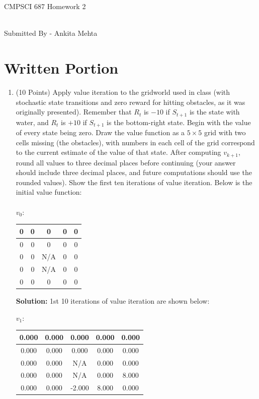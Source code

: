 \documentclass{article}
\begin{document}
\begin{center}
    \begin{Large}
    CMPSCI 687 Homework 2
    \end{Large}
    \\
    Submitted By - Ankita Mehta
\end{center}

\section*{Written Portion}
\begin{enumerate}
    \item (10 Points) Apply value iteration to the gridworld used in class (with stochastic state transitions and zero reward for hitting obstacles, as it was originally presented). Remember that $R_t$ is $-10$ if $S_{t+1}$ is the state with water, and $R_t$ is $+10$ if $S_{t+1}$ is the bottom-right state. Begin with the value of every state being zero. Draw the value function as a $5 \times 5$ grid with two cells missing (the obstacles), with numbers in each cell of the grid correspond to the current estimate of the value of that state. After computing $v_{k+1}$, round all values to three decimal places before continuing (your answer should include three decimal places, and future computations should use the rounded values). Show the first ten iterations of value iteration. Below is the initial value function:
    \\\\
    $v_0$:
    \begin{tabular}{|c|c|c|c|c|}
    \hline
        0 & 0 & 0 & 0 & 0\\
        \hline
        0 & 0 & 0 & 0 & 0\\
        \hline
        0 & 0 & N/A & 0 & 0\\
        \hline
        0 & 0 & N/A & 0 & 0\\
        \hline
        0 & 0 & 0 & 0 & 0\\
        \hline
    \end{tabular}
    
    \textbf{Solution:} 1st 10 iterations of value iteration are shown below:
    
    $v_1$:

 \begin{tabular}{|c|c|c|c|c|}

     \hline
      0.000 & 0.000 & 0.000 & 0.000 & 0.000  \\
    \hline
    0.000 & 0.000 & 0.000 & 0.000 & 0.000  \\
    \hline
     0.000 & 0.000 &  N/A & 0.000 & 0.000  \\
    \hline
     0.000 & 0.000 &  N/A & 0.000 & 8.000  \\
    \hline
    0.000 & 0.000 & -2.000 & 8.000 & 0.000  \\
    \hline


\end{tabular}
\end{enumerate}
\end{document}

